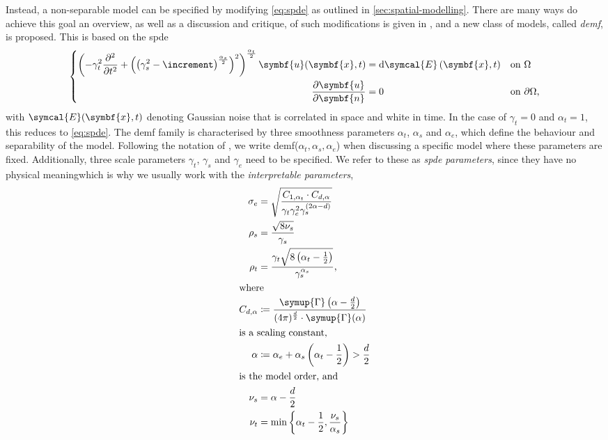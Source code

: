 \documentclass[british]{scrreprt}
\renewcommand{\laplacian}{\increment}
\begin{document}
Instead, a non-separable model can be specified by modifying \cref{eq:spde} as outlined in \cref{sec:spatial-modelling}. There are many ways do achieve this goal\textemdash{} an overview, as well as a discussion and critique, of such modifications is given in \cite{Lindgrendiffusionbasedspatiotemporalextension2022}, and a new class of models, called \textit{\gls{demf}}, is proposed. This is based on the \gls{spde}
\begin{equation}
    \left\{
    \begin{aligned}
        \left( -\gamma_{t}^{2} \pdv[2]{t} + \left( \left( \gamma_{s}^{2} - \laplacian \right)^{\frac{\alpha_{s}}{2}} \right)^{2} \right)^{\frac{\alpha_{t}}{2}} \symbf{u}(\symbf{x}, t) &= \dd \symcal{E}(\symbf{x}, t) &\text{on } &\Omega \\
        \pdv{\symbf{u}}{\symbf{n}} &= 0 &\text{on } &\partial\Omega
        \text{,}
    \end{aligned}
    \right.
    \label{eq:demf}
\end{equation}
with \( \symcal{E}(\symbf{x}, t) \) denoting Gaussian noise that is correlated in space and white in time. In the case of \( \gamma_{t} = 0 \) and \( \alpha_{t} = 1 \), this reduces to \cref{eq:spde}. The \gls{demf} family is characterised by three smoothness parameters \( \alpha_{t} \), \( \alpha_{s} \) and \( \alpha_{e} \), which define the behaviour and separability of the model. Following the notation of \cite{Lindgrendiffusionbasedspatiotemporalextension2022}, we write \gls{demf}(\( \alpha_{t}, \alpha_{s}, \alpha_{e} \)) when discussing a specific model where these parameters are fixed. Additionally, three scale parameters \( \gamma_{t} \), \( \gamma_{s} \) and \( \gamma_{e} \) need to be specified. We refer to these as \textit{\gls{spde} parameters}, since they have no physical meaning\textemdash{}which is why we usually work with the \textit{interpretable parameters},
\begin{align}
    \sigma_{e} &= \sqrt{\frac{C_{1, \alpha_{t}} \cdot C_{d, \alpha}}{\gamma_{t} \gamma_{e}^{2} \gamma_{s}^{(2 \alpha - d)}}}
    \label{eq:sigma-e} \\
    \rho_{s} &= \frac{\sqrt{8 \nu_{s}}}{\gamma_{s}}
    \label{eq:rho-s} \\
    \rho_{t} &= \frac{\gamma_{t} \sqrt{8 \left( \alpha_{t} - \frac{1}{2} \right)}}{\gamma_{s}^{\alpha_{s}}}
    \label{eq:rho-t}
    \text{,} \\
    \intertext{where}
    C_{d, \alpha} &\coloneqq \frac{\symup{\Gamma}\left( \alpha - \frac{d}{2} \right)}{(4 \pi)^{\frac{d}{2}} \cdot \symup{\Gamma}(\alpha)}
    \label{eq:C} \\
    \intertext{is a scaling constant,}
    \alpha &\coloneqq \alpha_{e} + \alpha_{s} \left( \alpha_{t} - \frac{1}{2} \right) > \frac{d}{2}
    \label{eq:alpha} \\
    \intertext{is the model order, and}
    \nu_{s} &= \alpha - \frac{d}{2}
    \label{eq:nu-s} \\
    \nu_{t} &= \min\left\{ \alpha_{t} - \frac{1}{2}, \frac{\nu_{s}}{\alpha_{s}} \right\}
    \label{eq:nu-t}
\end{align}
\end{document}
